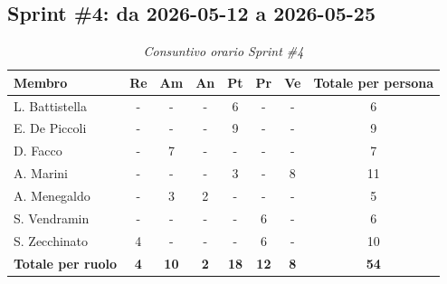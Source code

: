 \documentclass[a4paper, 10pt, colorlinks=true, linkcolor=black, urlcolor=blue, citecolor=blue, hidelinks]{article}
\renewcommand{\arraystretch}{1.2}
\begin{document}
\subsection{Sprint \#4: da 2026-05-12 a 2026-05-25}

\begin{table}[H]
    \centering
    \renewcommand{\arraystretch}{1.4}
    \begin{tabular}{|l|c|c|c|c|c|c|c|}
        \hline
        \rowcolor{bluBitless!15}
        \textbf{Membro} & \textbf{Re} & \textbf{Am} & \textbf{An} & \textbf{Pt} & \textbf{Pr} & \textbf{Ve} & \textbf{Totale per persona} \\
        \hline
        L. Battistella & - & - & - & 6 & - & - & 6 \\ \hline
        E. De Piccoli & - & - & - & 9 & - & - & 9 \\ \hline
        D. Facco & - & 7 & - & - & - & - & 7 \\ \hline
        A. Marini & - & - & - & 3 & - & 8 & 11 \\ \hline
        A. Menegaldo & - & 3 & 2 & - & - & - & 5 \\ \hline
        S. Vendramin & - & - & - & - & 6 & - & 6 \\ \hline
        S. Zecchinato & 4 & - & - & - & 6 & - & 10 \\ \hline
        \rowcolor{bluBitless!8}
        \textbf{Totale per ruolo} & \textbf{4} & \textbf{10} & \textbf{2} & \textbf{18} & \textbf{12} & \textbf{8} & \textbf{54} \\
        \hline
    \end{tabular}
    \caption{\textit{Consuntivo orario Sprint \#4}}
\end{table}
\end{document}
